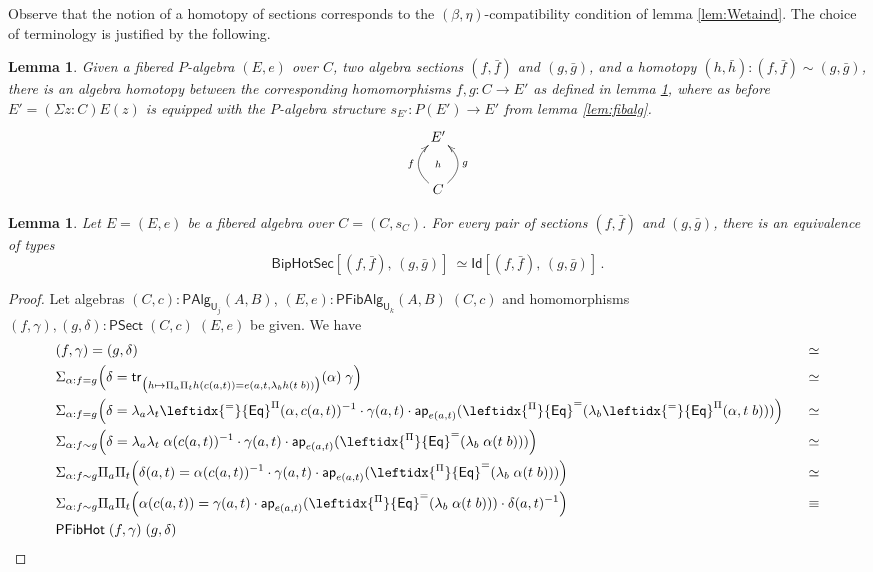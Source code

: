 \documentclass[reqno,10pt,a4paper,oneside]{amsart}
\numberwithin{equation}{section}
\theoremstyle{mythm}
\newtheorem{lemma}[theorem]{Lemma}
\theoremstyle{mydef}
\theoremstyle{myrmk}
\newcommand{\trans}{\mathsf{tr}}
\newcommand{\ct}{\cdot}
\newcommand{\funext}{\leftidx{^\Pi}{\mathsf{Eq}}^{=}}
\newcommand{\happly}{\leftidx{^=}{\mathsf{Eq}}^{\Pi}}
\newcommand{\prd}[1]{\Pi_{#1}}
\newcommand{\sm}[1]{\Sigma_{#1}}
\newcommand{\lam}[1]{\lambda_{#1}}
\newcommand{\app}{\mathsf{ap}}
\newcommand{\Id}{\mathsf{Id}}
\newcommand{\UU}{\mathsf{U}}
\newcommand{\HoSec}{\mathsf{BipHotSec}}
\newcommand{\WFibCell}{\mathsf{PFibHot}}
\newcommand{\WAlg}{\mathsf{PAlg}}
\newcommand{\WFibAlg}{\mathsf{PFibAlg}}
\newcommand{\WFibHom}{\mathsf{PSect}}
\begin{document}
Observe that the notion of a homotopy of sections corresponds to the $(\beta, \eta)$-compatibility condition of lemma \ref{lem:Wetaind}.  The choice of terminology is justified by the following.

\begin{lemma}\label{lem:fibalghom}
Given a fibered $P$-algebra $(E, e)$ over $C$, two algebra sections $(f, \bar{f})$ and $(g, \bar{g})$, and a homotopy $(h, \bar{h}) : (f, \bar{f}) \sim (g, \bar{g})$, there is an algebra  homotopy between the corresponding homomorphisms $f, g : C\to E'$ as defined in lemma \ref{lem:fibalghom}, where as before $E' = (\Sigma z : C) E(z)$ is equipped with the $P$-algebra structure $s_{E'} :P(E')\to E'$ from lemma \ref{lem:fibalg}.
\[
\xymatrix{
 E' \ar@{}[d]|{h} \\ 
C \ar@/^1.2pc/[u]^{f}  \ar@/_1.2pc/[u]_{g}
}
 \]
\end{lemma}




\begin{lemma}\label{lem:fibhomeqid} Let $E = (E, e)$ be a fibered algebra over $C = (C, s_C)$. 
For every pair of sections $(f, \bar{f})$ and $(g, \bar{g})$, 
there is an equivalence of types
\[
\HoSec[ (f, \bar{f}) ,\, (g, \bar{g}) ]\
\simeq 
\Id[ (f, \bar{f}) ,\, (g, \bar{g}) ] \, .
\]
\end{lemma}

\begin{proof}
Let algebras $(C,c) : \WAlg_{\UU_j}(A,B)$, $(E,e) : \WFibAlg_{\UU_k}(A,B) \; (C,c)$ and homomorphisms $(f,\gamma), (g,\delta) : \WFibHom \; (C,c) \; (E,e)$ be given. We have
\begin{alignat*}{4}
& (f,\gamma) = (g,\delta) & \simeq \\
& \sm{\alpha : f = g} \Big(\delta = \trans_{\big(h \mapsto \prd{a}\prd{t} h(c(a,t)) = e(a,t,\lam{b} h(t\;b))\big)}(\alpha) \; \gamma\Big) & \simeq \\
& \sm{\alpha : f = g} \Big(\delta = \lam{a} \lam{t} \happly(\alpha,c(a,t))^{-1} \ct \gamma(a,t) \ct \app_{e(a,t)}(\funext (\lam{b}\happly(\alpha,t \; b))) \Big) & \;\;\; \simeq \\
& \sm{\alpha : f \sim g} \Big(\delta = \lam{a} \lam{t} \; \alpha(c(a,t))^{-1} \ct \gamma(a,t) \ct \app_{e(a,t)}(\funext (\lam{b}\; \alpha(t \; b))) \Big) & \simeq \\
& \sm{\alpha : f \sim g} \prd{a}\prd{t}\Big(\delta(a,t) = \alpha(c(a,t))^{-1} \ct \gamma(a,t) \ct \app_{e(a,t)}(\funext (\lam{b}\; \alpha(t \; b))) \Big) & \simeq \\ 
& \sm{\alpha : f \sim g} \prd{a}\prd{t}\Big(\alpha(c(a,t)) = \gamma(a,t) \ct \app_{e(a,t)}(\funext (\lam{b}\; \alpha(t \; b))) \ct \delta(a,t)^{-1} \Big) & \equiv \\ 
& \WFibCell \; (f,\gamma) \; (g,\delta)
\end{alignat*}
\end{proof}
\end{document}
